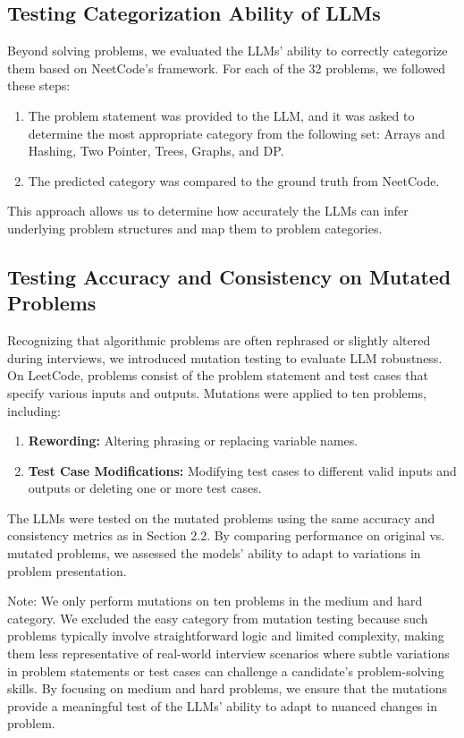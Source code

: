 \documentclass[times, 10pt,twocolumn]{article}
\begin{document}
\subsection{Testing Categorization Ability of LLMs}
Beyond solving problems, we evaluated the LLMs' ability to correctly categorize them based on NeetCode's framework. For each of the 32 problems, we followed these steps:

\begin{enumerate}
    \item The problem statement was provided to the LLM, and it was asked to determine the most appropriate category from the following set: Arrays and Hashing, Two Pointer, Trees, Graphs, and DP.
    \item The predicted category was compared to the ground truth from NeetCode.
\end{enumerate}

This approach allows us to determine how accurately the LLMs can infer underlying problem structures and map them to problem categories.

\subsection{Testing Accuracy and Consistency on Mutated Problems}

Recognizing that algorithmic problems are often rephrased or slightly altered during interviews, we introduced mutation testing to evaluate LLM robustness. On LeetCode, problems consist of the problem statement and test cases that specify various inputs and outputs. Mutations were applied to ten problems, including:
\begin{enumerate}
    \item \textbf{Rewording:} Altering phrasing or replacing variable names.
    \item \textbf{Test Case Modifications:} Modifying test cases to different valid inputs and outputs or deleting one or more test cases.
\end{enumerate}

The LLMs were tested on the mutated problems using the same accuracy and consistency metrics as in Section 2.2. By comparing performance on original vs. mutated problems, we assessed the models' ability to adapt to variations in problem presentation.

Note: We only perform mutations on ten problems in the medium and hard category. We excluded the easy category from mutation testing because such problems typically involve straightforward logic and limited complexity, making them less representative of real-world interview scenarios where subtle variations in problem statements or test cases can challenge a candidate's problem-solving skills. By focusing on medium and hard problems, we ensure that the mutations provide a meaningful test of the LLMs’ ability to adapt to nuanced changes in problem.
\end{document}
